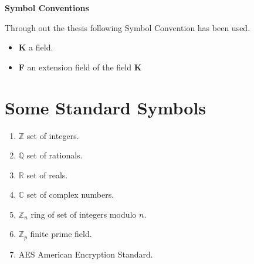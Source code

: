 
\hspace{-7mm}
  {\LARGE {\bfseries {Symbol Conventions}}}

  \vspace{7mm}

Through out the thesis following Symbol Convention has been used.\\[4mm]

\begin{itemize}
\item \textbf{K} \hspace{5mm} a field.
\item \textbf{F} \hspace{5mm} an extension field of the field \textbf{K}
\end{itemize}

\section*{Some Standard Symbols}
\begin{enumerate}
\item \(\mathbb{Z}\) \hspace{5mm} set of integers.
\item \(\mathbb{Q}\) \hspace{5mm} set of rationals.
\item \(\mathbb{R}\) \hspace{5mm} set of reals.
\item \(\mathbb{C}\) \hspace{5mm} set of complex numbers.
\item \(\mathbb{Z}_n\) \hspace{5mm} ring of set of integers modulo \(n\).
\item \(\mathbb{Z}_p\) \hspace{5mm} finite prime field.
  \item AES \hspace{5mm} American Encryption Standard.
\end{enumerate}
\clearpage

